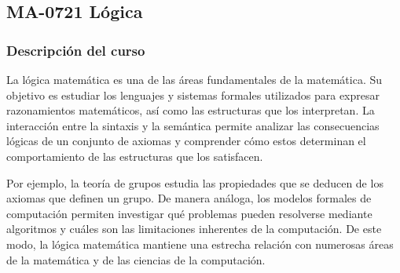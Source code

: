 \newpage
\subsection*{MA-0721 Lógica}

\hypertarget{MA0721}{}
\begin{refsection}
\begin{table}[H]
\end{table}

\subsubsection*{Descripción del curso}

La lógica matemática es una de las áreas fundamentales de la matemática. Su objetivo es estudiar los lenguajes y sistemas formales utilizados para expresar razonamientos matemáticos, así como las estructuras que los interpretan. La interacción entre la sintaxis y la semántica permite analizar las consecuencias lógicas de un conjunto de axiomas y comprender cómo estos determinan el comportamiento de las estructuras que los satisfacen.

Por ejemplo, la teoría de grupos estudia las propiedades que se deducen de los axiomas que definen un grupo. De manera análoga, los modelos formales de computación permiten investigar qué problemas pueden resolverse mediante algoritmos y cuáles son las limitaciones inherentes de la computación. De este modo, la lógica matemática mantiene una estrecha relación con numerosas áreas de la matemática y de las ciencias de la computación.


\end{refsection}
